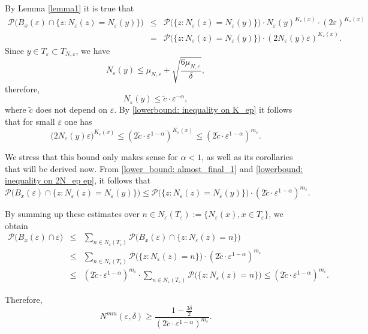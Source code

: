 \documentclass[12pt]{article}
\let\de\delta
\let\ep\varepsilon
\newcommand\PP{\mathcal P}
\let\le\leqslant
\let\ge\geqslant
\theoremstyle{definition}
\begin{document}
By Lemma \ref{lemma1} it is true that
\begin{eqnarray}  \nonumber
     \PP\big(B_{x}(\ep)\cap\{z: N_\ep(z) = N_\ep(y)\}\big)
     &\le&
     \PP\big(\{z:N_\ep(z) = N_\ep(y)\}\big)\cdot N_\ep(y)^{K_\ep(x)}\cdot (2\ep)^{K_\ep(x)} 
\\  \label{lower_bound: almost_final_1}
     &=&  \PP\big(\{z:N_\ep(z) = N_\ep(y)\}\big)\cdot (2N_\ep(y)\ep)^{K_\ep(x)}.
\end{eqnarray}
Since $y\in T_\ep\subset T_{N,\ep}$, we have
\[
    N_\ep(y) \le \mu_{N,\ep} + \sqrt{\frac{6\mu_{N,\ep}}{\delta}},
\]
therefore,
\[
    N_{\ep}(y) \le \tilde c \cdot \ep^{-\alpha},
\]
where $\tilde c$ does not depend on $\ep$. 
By \eqref{lowerbound: inequality on K_ep} it follows  that for small $\ep$ one has
\begin{equation}\label{lowerbound: inequality on 2N_ep ep}
    \big(2N_\ep(y)\ep\big)^{K_\ep(x)} \le (2\tilde c \cdot \ep^{1-\alpha})^{K_\ep(x)} \le (2\tilde c\cdot \ep^{1-\alpha})^{m_\ep}.
\end{equation}

We stress that this bound only makes sense for $\alpha<1$, as well as its corollaries that will be derived now.
From \eqref{lower_bound: almost_final_1} and \eqref{lowerbound: inequality on 2N_ep ep},
it follows that
\begin{equation*}
    \PP\big(B_{x}(\ep)\cap\{z: N_\ep(z) = N_\ep(y)\}\big) \le \PP\big(\{z:N_\ep(z) = N_\ep(y)\}\big)\cdot (2\tilde c\cdot \ep^{1-\alpha})^{m_\ep}.
\end{equation*}      

By summing up these estimates over $n\in N_\ep(T_\ep):= \{N_\ep(x), x\in T_\ep\}$, we obtain
\begin{eqnarray*} 
      \PP\big(B_x(\ep)\cap \ep\big)
      &\le& \sum_{n \in N_\ep(T_\ep)}\PP\big(B_{x}(\ep)\cap\{z: N_\ep(z) = n\}\big)
\\   
      &\le& \sum_{n \in N_\ep(T_\ep)} \PP\big(\{z: N_\ep(z) = n\}\big)
          \cdot(2\tilde c\cdot\ep^{1-\alpha})^{m_\ep}
\\   
      &\le& (2\tilde c\cdot\ep^{1-\alpha})^{m_\ep}
          \cdot\sum_{n \in N_\ep(T_\ep)}
               \PP\big(\{z: N_\ep(z) = n\}\big) 
       \le (2\tilde c\cdot \ep^{1-\alpha})^{m_\ep}.
\end{eqnarray*}


Therefore,
\begin{equation*}
    N^{mm}(\ep, \de) \ge \frac{1 - \frac{3\de}{2}}{(2\tilde c\cdot \ep^{1-\alpha})^{m_\ep}}.
\end{equation*}
\end{document}
